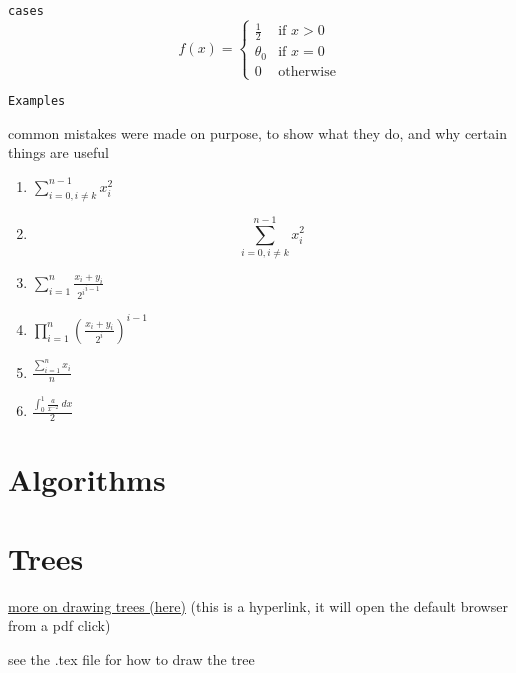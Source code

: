 \documentclass[11pt, oneside]{article}   	%
\newcommand{\bp}[1]{\left( #1 \right)}
\begin{document}
\texttt{cases}
\[
f(x) = \begin{cases}
    \frac{1}{2} &\text{if } x > 0 \\
    \theta_0    &\text{if } x = 0 \\
    0           &\text{otherwise}
\end{cases}
\]

\newpage
\begin{center}
\texttt{Examples}

\tiny{common mistakes were made on purpose, to show what they do, and why certain things are useful}
\end{center}
\begin{enumerate}[(1)]
    \item $\sum_{i=0,i\ne k}^{n-1} x_i^2$
    \item \[\sum_{i=0,i\ne k}^{n-1} x_i^2\]
    \item $\sum_{i=1}^n \frac{x_i+y_i}{{2^i}^{i-1}}$
    \item $\prod_{i=1}^n \bp{\frac{x_i+y_i}{2^i}}^{i-1}$
    \item $\frac{\sum_{i=1}^n x_i}{n}$
    \item $\frac{\int_0^1 \frac{a}{x^{-2}} \ dx}{2}$
\end{enumerate}




\newpage


\section{Algorithms} \noindent

\section{Trees} \noindent

\hyperlink{https://tikz.dev/tikz-trees}{more on drawing trees (here)} (this is a hyperlink, it will open the default browser from a pdf click)

see the .tex file for how to draw the tree

\begin{center}
    \end{center}
\end{document}
